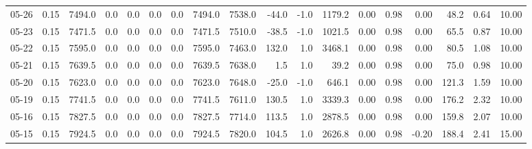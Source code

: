 \begin{threeparttable}
{\begin{tabular}{lrrrrrrrrrrrrrrrrr}
  05-26 &     0.15 & 7494.0 &               0.0 &               0.0 &                0.0 &                0.0 & 7494.0 & 7538.0 &      -44.0 &                     -1.0 &              1179.2 &       0.00 &      0.98 &           0.00 &             48.2 &            0.64 &                  10.00 \\
  05-23 &     0.15 & 7471.5 &               0.0 &               0.0 &                0.0 &                0.0 & 7471.5 & 7510.0 &      -38.5 &                     -1.0 &              1021.5 &       0.00 &      0.98 &           0.00 &             65.5 &            0.87 &                  10.00 \\
  05-22 &     0.15 & 7595.0 &               0.0 &               0.0 &                0.0 &                0.0 & 7595.0 & 7463.0 &      132.0 &                      1.0 &              3468.1 &       0.00 &      0.98 &           0.00 &             80.5 &            1.08 &                  10.00 \\
  05-21 &     0.15 & 7639.5 &               0.0 &               0.0 &                0.0 &                0.0 & 7639.5 & 7638.0 &        1.5 &                      1.0 &                39.2 &       0.00 &      0.98 &           0.00 &             75.0 &            0.98 &                  10.00 \\
  05-20 &     0.15 & 7623.0 &               0.0 &               0.0 &                0.0 &                0.0 & 7623.0 & 7648.0 &      -25.0 &                     -1.0 &               646.1 &       0.00 &      0.98 &           0.00 &            121.3 &            1.59 &                  10.00 \\
  05-19 &     0.15 & 7741.5 &               0.0 &               0.0 &                0.0 &                0.0 & 7741.5 & 7611.0 &      130.5 &                      1.0 &              3339.3 &       0.00 &      0.98 &           0.00 &            176.2 &            2.32 &                  10.00 \\
  05-16 &     0.15 & 7827.5 &               0.0 &               0.0 &                0.0 &                0.0 & 7827.5 & 7714.0 &      113.5 &                      1.0 &              2878.5 &       0.00 &      0.98 &           0.00 &            159.8 &            2.07 &                  10.00 \\
  05-15 &     0.15 & 7924.5 &               0.0 &               0.0 &                0.0 &                0.0 & 7924.5 & 7820.0 &      104.5 &                      1.0 &              2626.8 &       0.00 &      0.98 &          -0.20 &            188.4 &            2.41 &                  15.00 \\

\end{tabular}}
\end{threeparttable}
